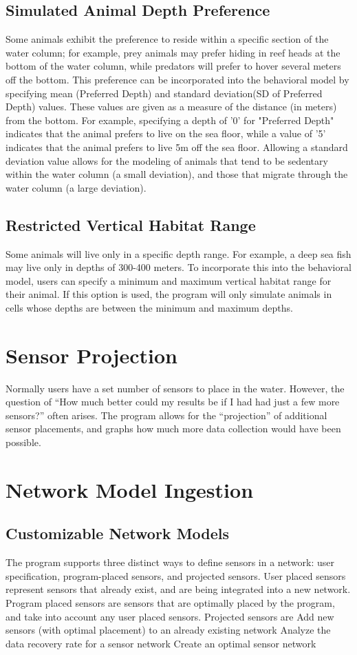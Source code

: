 \subsection{Simulated Animal Depth Preference}
Some animals exhibit the preference to reside within a specific section of the water column; for example, prey animals may prefer hiding in reef heads at the bottom of the water column, while predators will prefer to hover several meters off the bottom.  This preference can be incorporated into the behavioral model by specifying mean (Preferred Depth) and standard deviation(SD of Preferred Depth) values.  These values are given as a measure of the distance (in meters) from the bottom.  For example, specifying a depth of '0' for "Preferred Depth" indicates that the animal prefers to live on the sea floor, while a value of '5' indicates that the animal prefers to live 5m off the sea floor.  Allowing a standard deviation value allows for the modeling of animals that tend to be sedentary within the water column (a small deviation), and those that migrate through the water column (a large deviation).

\subsection{Restricted Vertical Habitat Range}
Some animals will live only in a specific depth range.  For example, a deep sea fish may live only in depths of 300-400 meters.  To incorporate this into the behavioral model, users can specify a minimum and maximum vertical habitat range for their animal.  If this option is used, the program will only simulate animals in cells whose depths are between the minimum and maximum depths.  


\section{Sensor Projection}
Normally users have a set number of sensors to place in the water.  However, the question of “How much better could my results be if I had had just a few more sensors?” often arises.   The program allows for the “projection” of additional sensor placements, and graphs how much more data collection would have been possible.

\section{Network Model Ingestion}
\subsection{Customizable Network Models}
The program supports three distinct ways to define sensors in a network: 
user specification, program-placed sensors, and projected sensors. 
User placed sensors represent sensors that already exist, and are being integrated into a new network.
Program placed sensors are sensors that are optimally placed by the program, and take into account any user placed sensors.
Projected sensors are 
Add new sensors (with optimal placement) to an already existing network
Analyze the data recovery rate for a sensor network
Create an optimal sensor network

